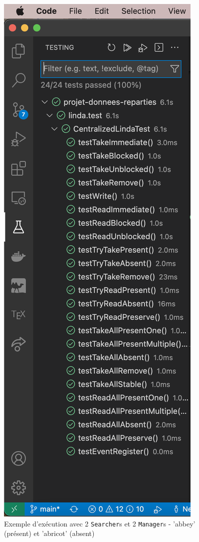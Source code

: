 \documentclass[headings=standardclasses,parskip=half]{scrartcl}
\begin{document}
\begin{figure}[h]
    \centering
    \includegraphics[scale=0.5]{tests-results.png}
    \caption{Exemple d'exécution avec 2 \texttt{Searcher}s
        et 2 \texttt{Manager}s - 'abbey' (présent) et 'abricot' (absent)}
\end{figure}
\end{document}
